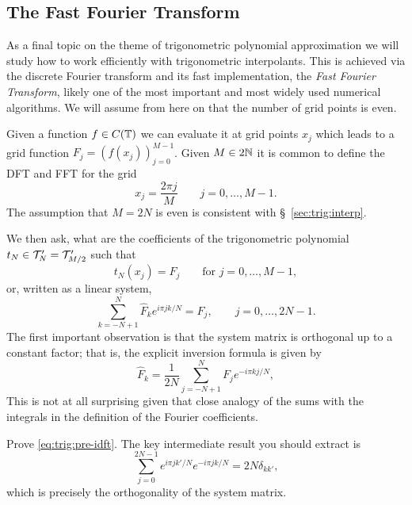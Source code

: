 \subsection{The Fast Fourier Transform}
%
\label{sec:trig:fft}
%
As a final topic on the theme of trigonometric polynomial approximation we will
study how to work efficiently with trigonometric interpolants. This is achieved
via the discrete Fourier transform and its fast implementation, the {\it Fast
Fourier Transform}, likely one of the most important and most widely used
numerical algorithms. We will assume from here on that the number of grid points
is even. 

Given a function $f \in C(\mathbb{T})$ we can evaluate it at grid points $x_j$ which
leads to a grid function $F_j = (f(x_j))_{j=0}^{M-1}$. Given $M \in 2\mathbb{N}$ it is
common to define the DFT and FFT for the grid
%
\[
    x_j = \frac{2\pi j}{M} \qquad j = 0, \dots, M-1.
\]
%
The assumption that $M = 2N$ is even is consistent with
\S~\ref{sec:trig:interp}. 

We then ask, what are the coefficients of the trigonometric polynomial $t_N \in
\mathcal{T}_{N}' = \mathcal{T}_{M/2}'$ such that
%
\[
  t_N(x_j) = F_j \qquad \text{for } j = 0, \dots, M-1, 
\]
%
or, written as a linear system, 
\begin{equation} \label{eq:trig:pre-dft-equi}
  \sum_{k = -N+1}^N \hat{F}_k e^{i \pi j k / N} = F_j, \qquad j = 0, \dots, 2N-1. 
\end{equation}
The first important observation is that the system matrix is orthogonal up to a constant factor; that is, the explicit inversion formula is given by 
\begin{equation} \label{eq:trig:pre-idft}
    \hat{F}_k = \frac{1}{2N} \sum_{j = -N+1}^N F_j e^{-i\pi k j /N},
\end{equation}
This is not at all surprising given that close analogy of the sums with the integrals in the definition of the Fourier coefficients. 

\begin{exercise}
  Prove \eqref{eq:trig:pre-idft}. The key intermediate result you should extract is 
  \begin{equation} \label{eq:trig:orth-dft}
    \sum_{j = 0}^{2N-1} 
    e^{i \pi j k' / N} e^{- i \pi j k / N} = 2 N \delta_{kk'},
  \end{equation}
  which is precisely the orthogonality of the system matrix. 
\end{exercise} 


